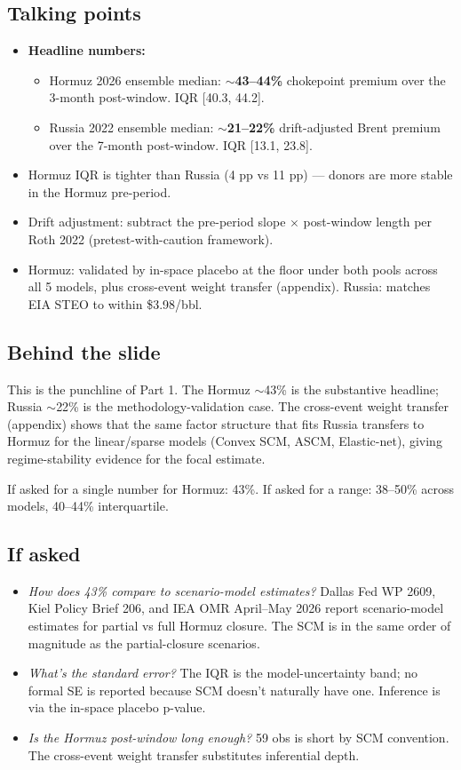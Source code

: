 \documentclass[11pt,a4paper]{article}
\newcommand{\highlight}[1]{\textcolor{accent}{\textbf{#1}}}
\begin{document}
\subsection{Talking points}
\begin{itemize}
  \item \highlight{Headline numbers:}
  \begin{itemize}
    \item Hormuz 2026 ensemble median: \highlight{$\sim$43--44\%} chokepoint premium over the 3-month post-window. IQR [40.3, 44.2].
    \item Russia 2022 ensemble median: \highlight{$\sim$21--22\%} drift-adjusted Brent premium over the 7-month post-window. IQR [13.1, 23.8].
  \end{itemize}
  \item Hormuz IQR is tighter than Russia (4 pp vs 11 pp) --- donors are more stable in the Hormuz pre-period.
  \item Drift adjustment: subtract the pre-period slope $\times$ post-window length per Roth 2022 (pretest-with-caution framework).
  \item Hormuz: validated by in-space placebo at the floor under both pools across all 5 models, plus cross-event weight transfer (appendix). Russia: matches EIA STEO to within \$3.98/bbl.
\end{itemize}

\subsection{Behind the slide}
This is the punchline of Part 1. The Hormuz $\sim$43\% is the substantive headline; Russia $\sim$22\% is the methodology-validation case. The cross-event weight transfer (appendix) shows that the same factor structure that fits Russia transfers to Hormuz for the linear/sparse models (Convex SCM, ASCM, Elastic-net), giving regime-stability evidence for the focal estimate.

If asked for a single number for Hormuz: 43\%. If asked for a range: 38--50\% across models, 40--44\% interquartile.

\subsection{If asked}
\begin{itemize}
  \item \textit{How does 43\% compare to scenario-model estimates?} Dallas Fed WP 2609, Kiel Policy Brief 206, and IEA OMR April--May 2026 report scenario-model estimates for partial vs full Hormuz closure. The SCM is in the same order of magnitude as the partial-closure scenarios.
  \item \textit{What's the standard error?} The IQR is the model-uncertainty band; no formal SE is reported because SCM doesn't naturally have one. Inference is via the in-space placebo p-value.
  \item \textit{Is the Hormuz post-window long enough?} 59 obs is short by SCM convention. The cross-event weight transfer substitutes inferential depth.
\end{itemize}
\end{document}

